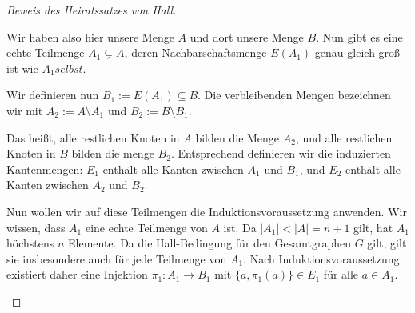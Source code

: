 \begin{proof}[Beweis des Heiratssatzes von Hall]
\begin{spoken-clean}[01:12:42 - 01:15:02]
Wir haben also hier unsere Menge $A$ und dort unsere Menge $B$. Nun gibt es eine echte Teilmenge $A_1 \subsetneq A$, deren Nachbarschaftsmenge $E(A_1)$ genau gleich groß ist wie $A_1 selbst$.

Wir definieren nun $B_1 := E(A_1) \subseteq B$. Die verbleibenden Mengen bezeichnen wir mit $A_2 := A \setminus A_1$ und $B_2 := B \setminus B_1$.

Das heißt, alle restlichen Knoten in $A$ bilden die Menge $A_2$, und alle restlichen Knoten in $B$ bilden die menge $B_2$. Entsprechend definieren wir die induzierten Kantenmengen: $E_1$ enthält alle Kanten zwischen $A_1$ und $B_1$, und $E_2$ enthält alle Kanten zwischen $A_2$ und $B_2$.
\end{spoken-clean}

\begin{math-stroke}
\begin{center}
\end{center}
\end{math-stroke}

\begin{spoken-clean}[01:15:02 - 01:17:32]
Nun wollen wir auf diese Teilmengen die Induktionsvoraussetzung anwenden. Wir wissen, dass $A_1$ eine echte Teilmenge von $A$ ist. Da $|A_1| < |A| = n+1$ gilt, hat $A_1$ höchstens $n$ Elemente. Da die Hall-Bedingung für den Gesamtgraphen $G$ gilt, gilt sie insbesondere auch für jede Teilmenge von $A_1$. Nach Induktionsvoraussetzung existiert daher eine Injektion $\pi_1 \colon A_1 \to B_1$ mit $\{a, \pi_1(a)\} \in E_1$ für alle $a \in A_1$.


\end{spoken-clean}
\end{proof}
